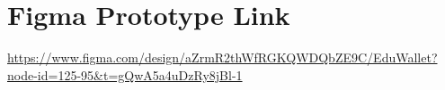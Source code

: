 \chapter{Figma Prototype Link}
\label{chap:figma}

\url{https://www.figma.com/design/aZrmR2thWfRGKQWDQbZE9C/EduWallet?node-id=125-95&t=gQwA5a4uDzRy8jBl-1}